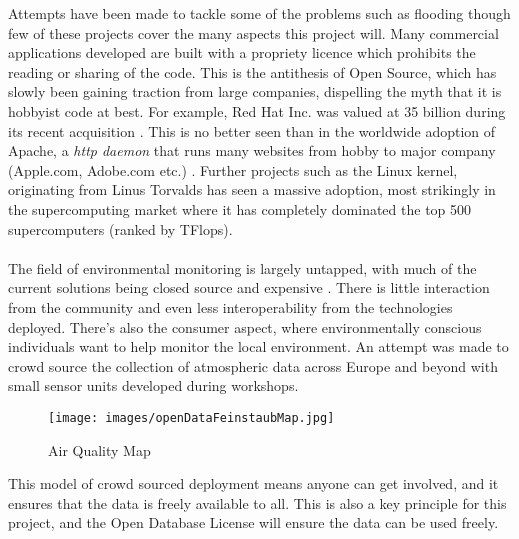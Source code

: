 Attempts have been made to tackle some of the problems such as flooding \citep{Castillo-Effen2004} though few of these projects cover the many aspects this project will. Many commercial applications developed are built with a propriety licence which prohibits the reading or sharing of the code. This is the antithesis of Open Source, which has slowly been gaining traction from large companies, dispelling the myth that it is hobbyist code at best. For example, Red Hat Inc. was valued at 35 billion during its recent acquisition \citep{Hammond2018}. This is no better seen than in the worldwide adoption of Apache, a \textit{http daemon} that runs many websites from hobby to major company (Apple.com, Adobe.com etc.) \citep{W3techs2018}. Further projects such as the Linux kernel, originating from Linus Torvalds has seen a massive adoption, most strikingly in the supercomputing market where it has completely dominated the top 500 supercomputers (ranked by TFlops). \citep{Top5002018}
\\\\
The field of environmental monitoring is largely untapped, with much of the current solutions being closed source and expensive \citep{TheIoTMarketplace2015}. There is little interaction from the community and even less interoperability from the technologies deployed. There's also the consumer aspect, where environmentally conscious individuals want to help monitor the local environment. An attempt was made to crowd source the collection of atmospheric data \citep{OKLabStuttgart2015} across Europe and beyond with small sensor units developed during workshops.
\begin{figure}[H]
	\centering
	\texttt{[image: images/openDataFeinstaubMap.jpg]}
	\caption{ Air Quality Map \citep{OKLabStuttgart2018}}
	\label{fig:map}
\end{figure}
This model of crowd sourced deployment means anyone can get involved, and it ensures that the data is freely available to all. This is also a key principle for this project, and the Open Database License \citep{OpenDataCommons2011} will ensure the data can be used freely.